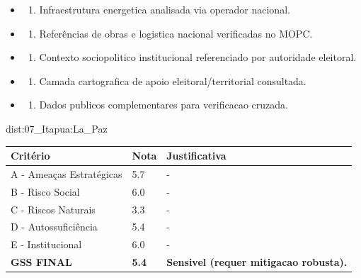{\begin{itemize}
\item
  \begin{enumerate}
  \def\labelenumi{\arabic{enumi})}
  \setcounter{enumi}{7}
  \tightlist
  \item
    Infraestrutura energetica analisada via operador nacional.
  \end{enumerate}
\item
  \begin{enumerate}
  \def\labelenumi{\arabic{enumi})}
  \setcounter{enumi}{8}
  \tightlist
  \item
    Referências de obras e logistica nacional verificadas no MOPC.
  \end{enumerate}
\item
  \begin{enumerate}
  \def\labelenumi{\arabic{enumi})}
  \setcounter{enumi}{9}
  \tightlist
  \item
    Contexto sociopolitico institucional referenciado por autoridade
    eleitoral.
  \end{enumerate}
\item
  \begin{enumerate}
  \def\labelenumi{\arabic{enumi})}
  \setcounter{enumi}{10}
  \tightlist
  \item
    Camada cartografica de apoio eleitoral/\allowbreak territorial consultada.
  \end{enumerate}
\item
  \begin{enumerate}
  \def\labelenumi{\arabic{enumi})}
  \setcounter{enumi}{11}
  \tightlist
  \item
    Dados publicos complementares para verificacao cruzada.
  \end{enumerate}
\end{itemize}}{dist:07_Itapua:La_Paz}
\begin{table}[ht!]
\small \begin{tabular}{p{3.0cm}p{0.8cm}p{6.0cm}} \toprule
\textbf{Critério} & \textbf{Nota} & \textbf{Justificativa} \\ \midrule
A - Ameaças Estratégicas & 5.7 & - \\
B - Risco Social & 6.0 & - \\
C - Riscos Naturais & 3.3 & - \\
D - Autossuficiência & 5.4 & - \\
E - Institucional & 6.0 & - \\
\midrule \textbf{GSS FINAL} & \textbf{5.4} & \textbf{Sensivel (requer mitigacao robusta).} \\ \bottomrule \end{tabular}
\end{table}
